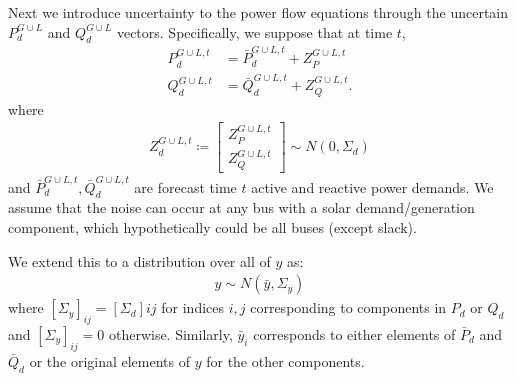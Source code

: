 Next we introduce uncertainty to the power flow equations through the uncertain $P_d^{G \cup L}$ and $Q_d^{G \cup L}$ vectors.
Specifically, we suppose that at time $t$, 
\begin{subequations}
\label{eq:stoch-load-model}
\begin{align}
P_d^{{G \cup L},t} &= \bar{P}_d^{{G \cup L},t} + Z_P^{{G \cup L},t} \\ 
Q_d^{{G \cup L},t} &= \bar{Q}_d^{{G \cup L},t} + Z_Q^{{G \cup L},t}.
\end{align}
\end{subequations}
where
\begin{align}
Z_d^{{G \cup L},t} \coloneqq
\begin{bmatrix}
Z_P^{{G \cup L},t} \\ Z_Q^{{G \cup L},t}
\end{bmatrix}
\sim N(0, \Sigma_d)
\end{align}
and $\bar{P}_d^{{G \cup L},t}, \bar{Q}_d^{{G \cup L},t}$ are forecast time $t$ active and reactive power demands.
We assume that the noise can occur at any bus with a solar demand/generation component, which hypothetically could be all buses (except slack).

We extend this to a distribution over all of $y$ as:
\begin{align}
y \sim N(\bar{y}, \Sigma_y)
\end{align}
where $[\Sigma_y]_{ij} = [\Sigma_d]{ij}$ for indices $i,j$ corresponding to components in $P_d$ or $Q_d$ and $[\Sigma_y]_{ij} = 0$ otherwise.
Similarly, $\bar{y}_i$ corresponds to either elements of $\bar{P}_d$ and $\bar{Q}_d$ or the original elements of $y$ for the other components.
